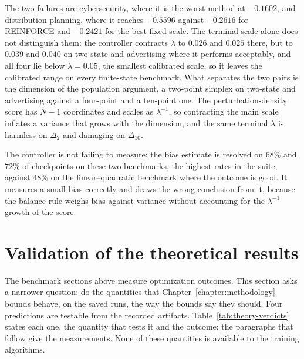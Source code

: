 The two failures are cybersecurity, where it is the worst method at $-0.1602$, and distribution planning, where it reaches $-0.5596$ against $-0.2616$ for REINFORCE and $-0.2421$ for the best fixed scale. The terminal scale alone does not distinguish them: the controller contracts $\lambda$ to $0.026$ and $0.025$ there, but to $0.039$ and $0.040$ on two-state and advertising where it performs acceptably, and all four lie below $\lambda=0.05$, the smallest calibrated scale, so it leaves the calibrated range on every finite-state benchmark. What separates the two pairs is the dimension of the population argument, a two-point simplex on two-state and advertising against a four-point and a ten-point one. The perturbation-density score has $N-1$ coordinates and scales as $\lambda^{-1}$, so contracting the main scale inflates a variance that grows with the dimension, and the same terminal $\lambda$ is harmless on $\Delta_2$ and damaging on $\Delta_{10}$.

The controller is not failing to measure: the bias estimate is resolved on $68\%$ and $72\%$ of checkpoints on these two benchmarks, the highest rates in the suite, against $48\%$ on the linear--quadratic benchmark where the outcome is good. It measures a small bias correctly and draws the wrong conclusion from it, because the balance rule weighs bias against variance without accounting for the $\lambda^{-1}$ growth of the score.

\section{Validation of the theoretical results}
\label{sec:theory-validation}

The benchmark sections above measure optimization outcomes. This section asks a narrower question: do the quantities that Chapter~\ref{chapter:methodology} bounds behave, on the saved runs, the way the bounds say they should. Four predictions are testable from the recorded artifacts. Table~\ref{tab:theory-verdicts} states each one, the quantity that tests it and the outcome; the paragraphs that follow give the measurements. None of these quantities is available to the training algorithms.

